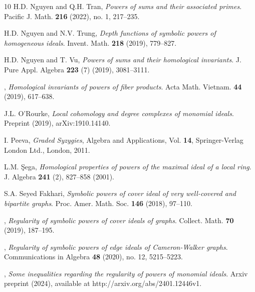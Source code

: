 \documentclass{amsart}
\theoremstyle{plain}
\theoremstyle{definition}
\numberwithin{equation}{section}
\begin{document}
\begin{thebibliography}{10}
H.D. Nguyen and Q.H. Tran,
\emph{Powers of sums and their associated primes}.
Pacific J. Math. {\bf 216} (2022), no. 1, 217--235.

H.D. Nguyen and N.V. Trung, 
\emph{Depth functions of symbolic powers of homogeneous ideals}. 
Invent. Math. {\bf 218} (2019), 779--827.


H.D. Nguyen and T. Vu, 
\emph{Powers of sums and their homological invariants}. 
J. Pure Appl. Algebra {\bf 223} (7) (2019), 3081--3111.


\bysame,
\emph{Homological invariants of powers of fiber products}.
Acta Math. Vietnam. {\bf 44} (2019), 617--638.

J.L. O'Rourke,
\emph{Local cohomology and degree complexes of monomial ideals}.
Preprint (2019), arXiv:1910.14140.

I. Peeva, 
{\it Graded Syzygies}, 
Algebra and Applications, Vol. {\bf 14}, Springer-Verlag London Ltd., London, 2011.

L.M. \c{S}ega,
\emph{Homological properties of powers of the maximal ideal of a local ring}. 
J. Algebra {\bf 241} (2), 827--858 (2001).


S.A. Seyed Fakhari,
\emph{Symbolic powers of cover ideal of very well-covered and bipartite graphs}.
Proc. Amer. Math. Soc. {\bf 146} (2018), 97--110.

\bysame,
\emph{Regularity of symbolic powers of cover ideals of graphs}.
Collect. Math. {\bf 70} (2019), 187--195.

\bysame, 
\emph{Regularity of symbolic powers of edge ideals of Cameron-Walker graphs}. 
Communications in Algebra {\bf 48} (2020), no. 12, 5215--5223.

\bysame,
\emph{Some inequalities regarding the regularity of powers of monomial ideals}.
Arxiv preprint (2024), available at \textsf{http://arxiv.org/abs/2401.12446v1}.


\end{thebibliography}

\end{document}
